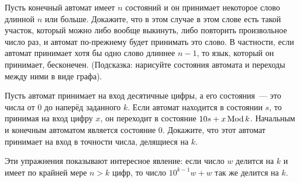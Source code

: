 \begin{exercise}
	Пусть конечный автомат имеет $n$ состояний и он принимает некоторое слово длинной $n$ или больше. Докажите, что в этом случае в этом слове есть такой участок, который можно либо вообще выкинуть, либо повторить произвольное число раз, и автомат по-прежнему будет принимать это слово. В частности, если автомат принимает хотя бы одно слово длиннее $n-1$, то язык, который он принимает, бесконечен. (Подсказка: нарисуйте состояния автомата и переходы между ними в виде графа).
\end{exercise}

\begin{exercise}
	Пусть автомат принимает на вход десятичные цифры, а его состояния~— это числа от 0 до наперёд заданного $k$. Если автомат находится в состоянии $s$, то принимая на вход цифру $x$, он переходит в состояние $10s + x \operatorname{Mod} k$. Начальным и конечным автоматом является состояние 0. Докажите, что этот автомат принимает на вход в точности числа, делящиеся на $k$.
\end{exercise}

Эти упражнения показывают интересное явление: если число $w$ делится на $k$ и имеет по крайней мере $n>k$ цифр, то число $10^{k-1}w + w$ так же делится на $k$.